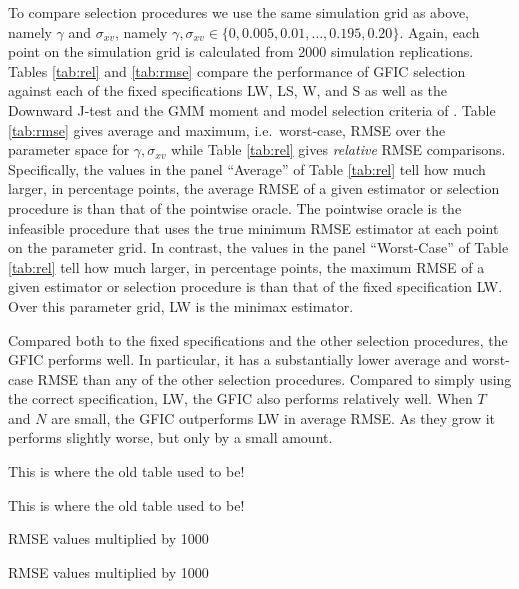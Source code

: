 To compare selection procedures we use the same simulation grid as above, namely $\gamma$ and $\sigma_{xv}$, namely $\gamma, \sigma_{xv} \in \{0, 0.005, 0.01, \hdots, 0.195, 0.20\}$.  
Again, each point on the simulation grid is calculated from 2000 simulation replications. 
Tables \ref{tab:rel} and \ref{tab:rmse} compare the performance of GFIC selection against each of the fixed specifications LW, LS, W, and S as well as the Downward J-test and the GMM moment and model selection criteria of \cite{AndrewsLu}. 
Table \ref{tab:rmse} gives average and maximum, i.e.\ worst-case, RMSE over the parameter space for $\gamma, \sigma_{xv}$ while Table \ref{tab:rel} gives \emph{relative} RMSE comparisons. Specifically, the values in the panel ``Average'' of Table \ref{tab:rel} tell how much larger, in percentage points, the average RMSE of a given estimator or selection procedure is than that of the pointwise oracle. 
The pointwise oracle is the infeasible procedure that uses the true minimum RMSE estimator at each point on the parameter grid. 
In contrast, the values in the panel ``Worst-Case'' of Table \ref{tab:rel} tell how much larger, in percentage points, the maximum RMSE of a given estimator or selection procedure is than that of the fixed specification LW. 
Over this parameter grid, LW is the minimax estimator.

Compared both to the fixed specifications and the other selection procedures, the GFIC performs well. 
In particular, it has a substantially lower average and worst-case RMSE than any of the other selection procedures.
Compared to simply using the correct specification, LW, the GFIC also performs relatively well. 
When $T$ and $N$ are small, the GFIC outperforms LW in average RMSE. 
As they grow it performs slightly worse, but only by a small amount.


\begin{table}[!tbp]
  \centering
\caption{This is where the old table used to be!}
\label{tab:rel}
\end{table}


\begin{table}[!tbp]
  \centering
\caption{This is where the old table used to be!}
\label{tab:rmse}
\end{table}
\begin{table}
  \footnotesize
  \centering
  
  
  \vspace{2em}

  
  \caption{RMSE values multiplied by 1000}
\end{table}

\begin{table}
  \footnotesize
  \centering
  
  \caption{RMSE values multiplied by 1000}
\end{table}



